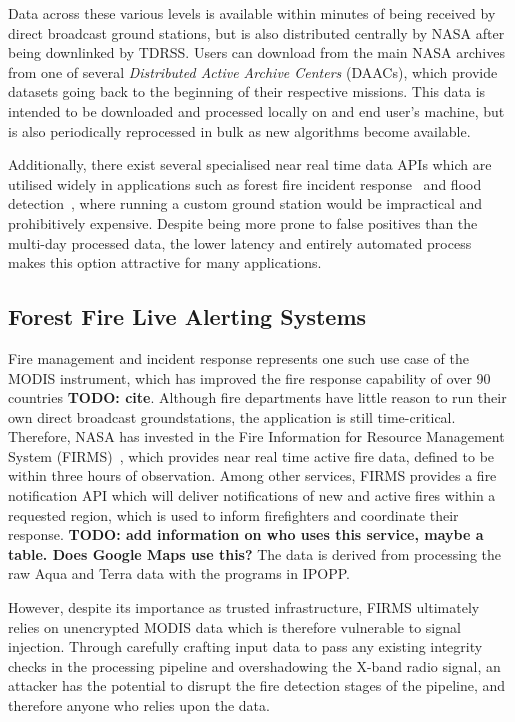 Data across these various levels is available within minutes of being received by direct broadcast ground stations, but is also distributed centrally by NASA after being downlinked by TDRSS.
Users can download from the main NASA archives from one of several \textit{Distributed Active Archive Centers} (DAACs), which provide datasets going back to the beginning of their respective missions.
This data is intended to be downloaded and processed locally on and end user's machine, but is also periodically reprocessed in bulk as new algorithms become available.

Additionally, there exist several specialised near real time data APIs which are utilised widely in applications such as forest fire incident response~\cite{nasaFirms} and flood detection~\cite{nasaFlood}, where running a custom ground station would be impractical and prohibitively expensive.
Despite being more prone to false positives than the multi-day processed data, the lower latency and entirely automated process makes this option attractive for many applications.

\subsection{Forest Fire Live Alerting Systems}

Fire management and incident response represents one such use case of the MODIS instrument, which has improved the fire response capability of over 90 countries \textbf{TODO: cite}.
Although fire departments have little reason to run their own direct broadcast groundstations, the application is still time-critical.
Therefore, NASA has invested in the Fire Information for Resource Management System (FIRMS)~\cite{firmsIndex}, which provides near real time active fire data, defined to be within three hours of observation.
Among other services, FIRMS provides a fire notification API which will deliver notifications of new and active fires within a requested region, which is used to inform firefighters and coordinate their response.
\textbf{TODO: add information on who uses this service, maybe a table. Does Google Maps use this?}
The data is derived from processing the raw Aqua and Terra data with the programs in IPOPP.

However, despite its importance as trusted infrastructure, FIRMS ultimately relies on unencrypted MODIS data which is therefore vulnerable to signal injection.
Through carefully crafting input data to pass any existing integrity checks in the processing pipeline and overshadowing the X-band radio signal, an attacker has the potential to disrupt the fire detection stages of the pipeline, and therefore anyone who relies upon the data.

